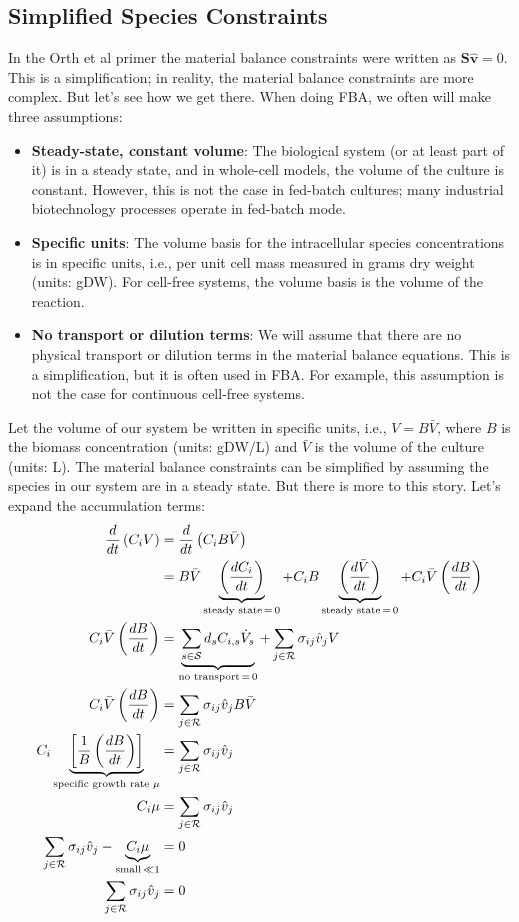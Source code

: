 \documentclass{article}[11pt]
\begin{document}
\subsection{Simplified Species Constraints}
In the Orth et al primer \cite{Orth:2010aa} the material balance constraints were written as $\mathbf{S}\hat{\mathbf{v}} = 0$. 
This is a simplification; in reality, the material balance constraints are more complex. But let's see how we get there.
When doing FBA, we often will make three assumptions:
\begin{itemize}[leftmargin=16pt]
\item{\textbf{Steady-state, constant volume}: The biological system (or at least part of it) is in a steady state, and in whole-cell models, the volume of the culture is constant. However, this is not the case in fed-batch cultures; many industrial biotechnology processes operate in fed-batch mode.}
\item{\textbf{Specific units}: The volume basis for the intracellular species concentrations is in specific units, i.e., per unit cell mass measured in grams dry weight (units: gDW). For cell-free systems, the volume basis is the volume of the reaction.}
\item{\textbf{No transport or dilution terms}: We will assume that there are no physical transport or dilution terms in the material balance equations. This is a simplification, but it is often used in FBA. For example, this assumption is not the case for continuous cell-free systems.}
\end{itemize}

Let the volume of our system be written in specific units, i.e., $V=B\bar{V}$, where $B$ is the biomass concentration (units: gDW/L) and $\bar{V}$ is the volume of the culture (units: L). 
The material balance constraints can be simplified by assuming the species in our system are in a steady state. 
But there is more to this story. Let's expand the accumulation terms:
\begin{align*}
\frac{d}{dt}\left(C_{i}V\right) &= \frac{d}{dt}\left(C_{i}B\bar{V}\right)\\
&= B\bar{V}\underbrace{\left(\frac{dC_{i}}{dt}\right)}_{\text{steady state}\,=\,0} + C_{i}B\underbrace{\left(\frac{d\bar{V}}{dt}\right)}_{\text{steady state\,=\,0}} + C_{i}\bar{V}\left(\frac{dB}{dt}\right)\\
C_{i}\bar{V}\left(\frac{dB}{dt}\right) & = \underbrace{\sum_{s\in\mathcal{S}}d_{s}C_{i,s}\dot{V}_{s}}_{\text{no transport\,=\,0}} + \sum_{j\in\mathcal{R}}\sigma_{ij}\hat{v}_{j}V\\
C_{i}\bar{V}\left(\frac{dB}{dt}\right) & = \sum_{j\in\mathcal{R}}\sigma_{ij}\hat{v}_{j}B\bar{V}\\
C_{i}\underbrace{\left[\frac{1}{B}\left(\frac{dB}{dt}\right)\right]}_{\text{specific growth rate $\mu$}} & = \sum_{j\in\mathcal{R}}\sigma_{ij}\hat{v}_{j}\\
C_{i}\mu & = \sum_{j\in\mathcal{R}}\sigma_{ij}\hat{v}_{j}\\
\sum_{j\in\mathcal{R}}\sigma_{ij}\hat{v}_{j} - \underbrace{C_{i}\mu}_{\text{small}\,\ll{1}} & = 0\\
\sum_{j\in\mathcal{R}}\sigma_{ij}\hat{v}_{j} & = 0
\end{align*}
\end{document}
